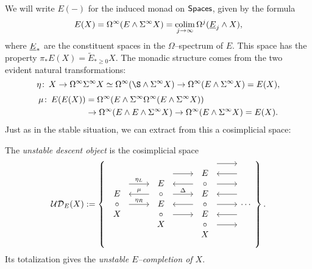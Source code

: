 We will write $E(-)$ for the induced monad on $\mathsf{Spaces}$, given by the formula \[E(X) = \Omega^\infty (E \wedge \Sigma^\infty X) = \operatorname*{colim}_{j \to \infty} \Omega^j (\underline{\smash{E}}_{j} \wedge X),\] where $\underline{\smash{E}}_{*}$ are the constituent spaces in the $\Omega$--spectrum of $E$.  This space has the property $\pi_* E(X) = \widetilde E_{* \ge 0} X$.  The monadic structure comes from the two evident natural transformations:
\[\eta\co X \to \Loops^\infty \Susp^\infty X \simeq \Loops^\infty (\S \sm \Susp^\infty X) \to \Loops^\infty (E \sm \Susp^\infty X) = E(X),\]
\begin{align*}
\mu\colon\thinspace E(E(X)) & = \Omega^\infty(E \wedge \Sigma^\infty\Omega^\infty(E \wedge \Sigma^\infty X)) \\
& \to \Omega^\infty(E \wedge E \wedge \Sigma^\infty X) \to \Omega^\infty(E \wedge \Sigma^\infty X) = E(X).
\end{align*}
Just as in the stable situation, we can extract from this a cosimplicial space:
\begin{definition}
The \textit{unstable descent object} is the cosimplicial space
\[\sheaf{UD}_E(X) := \left\{
\begin{tikzcd}
\begin{array}{c} E \\ \circ \\ X \end{array} \arrow[leftarrow, shift left=\baselineskip]{r}{\mu} \arrow[shift left=(2*\baselineskip)]{r}{\eta_L} \arrow{r}{\eta_R} &
\begin{array}{c} E \\ \circ \\ E \\ \circ \\ X \end{array} \arrow[shift left=(3*\baselineskip)]{r} \arrow[leftarrow, shift left=(2*\baselineskip)]{r} \arrow[shift left=\baselineskip]{r}{\Delta} \arrow[leftarrow]{r} \arrow[shift right=\baselineskip]{r} &
\begin{array}{c} E \\ \circ \\ E \\ \circ \\ E \\ \circ \\ X \end{array} \arrow[shift left=(4*\baselineskip)]{r} \arrow[leftarrow, shift left=(3*\baselineskip)]{r} \arrow[shift left=(2*\baselineskip)]{r} \arrow[leftarrow, shift left=\baselineskip]{r} \arrow{r} \arrow[leftarrow, shift right=\baselineskip]{r} \arrow[shift right=(2*\baselineskip)]{r} &
\cdots
\end{tikzcd}
\right\}.\]
Its totalization gives the \textit{unstable $E$--completion of $X$}.
\end{definition}

